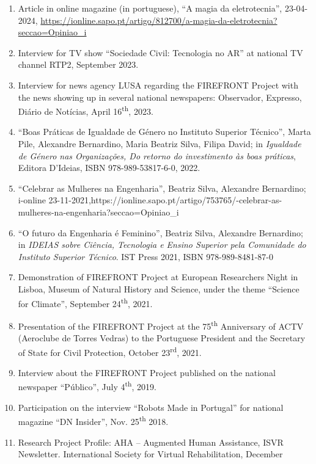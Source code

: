 \documentclass[
]{article}
\begin{document}
\begin{enumerate}
\def\labelenumi{\arabic{enumi}.}
\item
  Article in online magazine (in portuguese), ``A magia da
  eletrotecnia'', 23-04-2024,
  \url{https://ionline.sapo.pt/artigo/812700/a-magia-da-eletrotecnia?seccao=Opiniao_i}
\item
  Interview for TV show ``Sociedade Civil: Tecnologia no AR'' at
  national TV channel RTP2, September 2023.
\item
  Interview for news agency LUSA regarding the FIREFRONT Project with
  the news showing up in several national newspapers: Observador,
  Expresso, Diário de Notícias, April 16\textsuperscript{th}, 2023.
\item
  ``Boas Práticas de Igualdade de Género no Instituto Superior
  Técnico'', Marta Pile, Alexandre Bernardino, Maria Beatriz Silva,
  Filipa David; in \emph{Igualdade de Género nas Organizações, Do
  retorno do investimento às boas práticas}, Editora D'Ideias, ISBN
  978-989-53817-6-0, 2022.
\item
  ``Celebrar as Mulheres na Engenharia'', Beatriz Silva, Alexandre
  Bernardino; i-online
  23-11-2021,https://ionline.sapo.pt/artigo/753765/-celebrar-as-mulheres-na-engenharia?seccao=Opiniao\_i
\item
  ``O futuro da Engenharia é Feminino'', Beatriz Silva, Alexandre
  Bernardino; in \emph{IDEIAS sobre Ciência, Tecnologia e Ensino
  Superior pela Comunidade do Instituto Superior Técnico}. IST Press
  2021, ISBN 978-989-8481-87-0
\item
  Demonstration of FIREFRONT Project at European Researchers Night in
  Lisboa, Museum of Natural History and Science, under the theme
  ``Science for Climate'', September 24\textsuperscript{th}, 2021.
\item
  Presentation of the FIREFRONT Project at the 75\textsuperscript{th}
  Anniversary of ACTV (Aeroclube de Torres Vedras) to the Portuguese
  President and the Secretary of State for Civil Protection, October
  23\textsuperscript{rd}, 2021.
\item
  Interview about the FIREFRONT Project published on the national
  newspaper ``Público'', July 4\textsuperscript{th}, 2019.
\item
  Participation on the interview ``Robots Made in Portugal'' for
  national magazine ``DN Insider'', Nov. 25\textsuperscript{th} 2018.
\item
  Research Project Profile: AHA -- Augmented Human Assistance, ISVR
  Newsletter. International Society for Virtual Rehabilitation, December

\end{enumerate}
\end{document}
